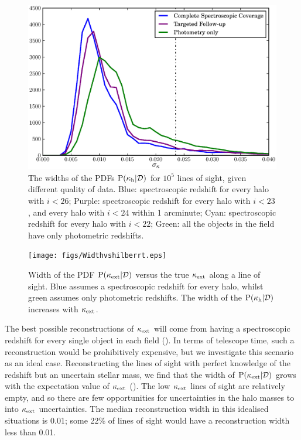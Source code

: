 \documentclass[useAMS,usenatbib]{mn2e}
\begin{document}
\begin{figure}
\includegraphics[width=\columnwidth]{figs/Width.eps}
\caption{The widths of the \infered PDFs ${\rm P}(\kappa_{\rm h}|{\mathcal{D}})$ for
$10^5$ lines of sight, given different quality of data. Blue:
spectroscopic redshift for every halo with $i<26$; Purple: 
spectroscopic redshift for every halo with $i<23$, and every halo with $i<24$
within 1 arcminute; Cyan: spectroscopic redshift for every halo with $i<22$; 
Green: all the objects in the field have only photometric redshifts.}
\label{fig:reconwidths}
\end{figure}

\begin{figure}
\texttt{[image: figs/Widthvshilberrt.eps]}
\caption{Width of the \infered PDF ${\rm P}(\kappa_{\rm ext}|{\mathcal{D}})$ versus the true
$\kappa_{\rm ext}$ along a line of sight. Blue assumes a spectroscopic redshift for
every halo, whilst green assumes only photometric redshifts. The width of the
\infered ${\rm P}(\kappa_{\rm h}|{\mathcal{D}})$ increases with $\kappa_{\rm ext}$.}

\label{fig:widthsvsH}
\end{figure}

The best possible reconstructions of $\kappa_{\rm ext}$ will come from having a
spectroscopic redshift for every single object in each field
().  In terms of telescope time, such a reconstruction
would be prohibitively expensive, but we investigate this scenario as an ideal
case. Reconstructing the lines of sight with perfect knowledge of the redshift
but an uncertain stellar mass, we find that the width of ${\rm P}(\kappa_{\rm ext}|{\mathcal{D}})$
grows with the expectation value of $\kappa_{\rm ext}$ (). The low
$\kappa_{\rm ext}$ lines of sight are relatively empty, and so there are few
opportunities for uncertainties in the halo masses to \propogate into $\kappa_{\rm ext}$
uncertainties. The median reconstruction width in this idealised situations is
0.01; some 22\% of lines of sight would have a reconstruction width less
than 0.01. 
\end{document}
